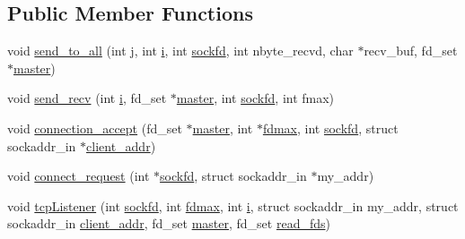 \subsection*{Public Member Functions}
\begin{DoxyCompactItemize}
\item 
void \hyperlink{class_server_abbee7dec4c00af1d635f0e14314e408a}{send\+\_\+to\+\_\+all} (int j, int \hyperlink{class_server_a2792b877f5f7dbccbcb0ebe508ba8bf4}{i}, int \hyperlink{class_server_a284abf5ae92eeed0f5e28759d382dd2d}{sockfd}, int nbyte\+\_\+recvd, char $\ast$recv\+\_\+buf, fd\+\_\+set $\ast$\hyperlink{class_server_a19d11be457efea552874f318a14ac808}{master})
\item 
void \hyperlink{class_server_a60449f7427eb90721474016c4cfe1f9a}{send\+\_\+recv} (int \hyperlink{class_server_a2792b877f5f7dbccbcb0ebe508ba8bf4}{i}, fd\+\_\+set $\ast$\hyperlink{class_server_a19d11be457efea552874f318a14ac808}{master}, int \hyperlink{class_server_a284abf5ae92eeed0f5e28759d382dd2d}{sockfd}, int fmax)
\item 
void \hyperlink{class_server_af59e99baec721a57a03ded0e310765e1}{connection\+\_\+accept} (fd\+\_\+set $\ast$\hyperlink{class_server_a19d11be457efea552874f318a14ac808}{master}, int $\ast$\hyperlink{class_server_ad99b9998fb160ed17033e1e1e9032440}{fdmax}, int \hyperlink{class_server_a284abf5ae92eeed0f5e28759d382dd2d}{sockfd}, struct sockaddr\+\_\+in $\ast$\hyperlink{class_server_af0a54fbe85fc98a78e74df6f201f206d}{client\+\_\+addr})
\item 
void \hyperlink{class_server_a89d62ab21574021dcd9042c6e817fa48}{connect\+\_\+request} (int $\ast$\hyperlink{class_server_a284abf5ae92eeed0f5e28759d382dd2d}{sockfd}, struct sockaddr\+\_\+in $\ast$my\+\_\+addr)
\item 
void \hyperlink{class_server_a87a6e60545a3ac8244761c27940fc256}{tcp\+Listener} (int \hyperlink{class_server_a284abf5ae92eeed0f5e28759d382dd2d}{sockfd}, int \hyperlink{class_server_ad99b9998fb160ed17033e1e1e9032440}{fdmax}, int \hyperlink{class_server_a2792b877f5f7dbccbcb0ebe508ba8bf4}{i}, struct sockaddr\+\_\+in my\+\_\+addr, struct sockaddr\+\_\+in \hyperlink{class_server_af0a54fbe85fc98a78e74df6f201f206d}{client\+\_\+addr}, fd\+\_\+set \hyperlink{class_server_a19d11be457efea552874f318a14ac808}{master}, fd\+\_\+set \hyperlink{class_server_a06e809efd5707f6a10935790c5978eb7}{read\+\_\+fds})
\end{DoxyCompactItemize}

